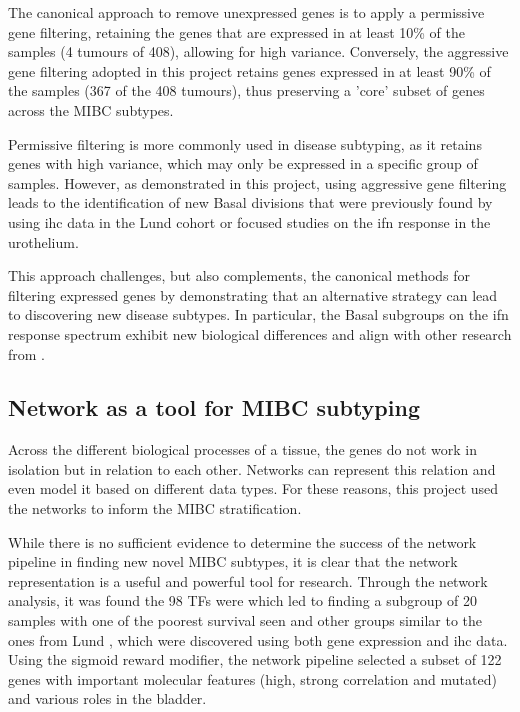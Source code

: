 The canonical approach to remove unexpressed genes is to apply a permissive gene filtering, retaining the genes that are expressed in at least 10\% of the samples (4 tumours of 408), allowing for high variance. Conversely, the aggressive gene filtering adopted in this project retains genes expressed in at least 90\% of the samples (367 of the 408 tumours), thus preserving a 'core' subset of genes across the \gls{MIBC} subtypes.

Permissive filtering is more commonly used in disease subtyping, as it retains genes with high variance, which may only be expressed in a specific group of samples. However, as demonstrated in this project, using aggressive gene filtering leads to the identification of new Basal divisions that were previously found by using \acrshort{ihc} data in the Lund cohort \citep{Marzouka2018-ge} or focused studies on the \acrshort{ifn} response in the urothelium.

This approach challenges, but also complements, the canonical methods for filtering expressed genes by demonstrating that an alternative strategy can lead to discovering new disease subtypes. In particular, the Basal subgroups on the \acrshort{ifn} response spectrum exhibit new biological differences and align with other research from \citep{Marzouka2018-ge,Baker2022-bj}.


\subsection*{Network as a tool for MIBC subtyping}

Across the different biological processes of a tissue, the genes do not work in isolation but in relation to each other. Networks can represent this relation and even model it based on different data types. For these reasons, this project used the networks to inform the MIBC stratification. 

While there is no sufficient evidence to determine the success of the network pipeline in finding new novel MIBC subtypes, it is clear that the network representation is a useful and powerful tool for research. Through the network analysis, it was found the 98 TFs were which led to finding a subgroup of 20 samples with one of the poorest survival seen and other groups similar to the ones from Lund \citep{Marzouka2018-ge}, which were discovered using both gene expression and \acrshort{ihc} data. Using the sigmoid reward modifier, the network pipeline selected a subset of 122 genes with important molecular features (high, strong correlation and mutated) and various roles in the bladder.

